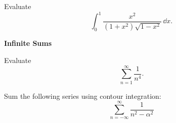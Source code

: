 {\begin{Exercise}
\end{Exercise}






\begin{Exercise}
  \label{exercise x^2/((1+x^2)sqrt(1-x^2))}
  Evaluate
  \[
  \int_0^1 \frac{ x^2 }{ (1+x^2) \sqrt{1-x^2} } \,\dd x.
  \]

\end{Exercise}




\begin{large}
  \noindent
  \textbf{Infinite Sums}
\end{large}



\begin{Exercise}
  \label{exercise sum 1/n^4}
  Evaluate
  \[
  \sum_{n=1}^\infty \frac{1}{n^4}.
  \]

\end{Exercise}








\begin{Exercise}
  \label{exercise sum 1/(n^2-a^2)}
  Sum the following series using contour integration:
  \[
  \sum_{n = -\infty}^\infty \frac{1}{n^2 - \alpha^2}
  \]

\end{Exercise}

























\raggedbottom
}
